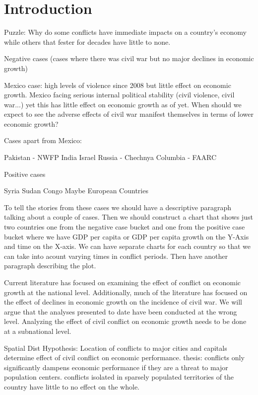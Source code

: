 \section{Introduction}
\label{intro}

Puzzle: Why do some conflicts have immediate impacts on a country's economy while others that fester for decades have little to none. 	

	Negative cases (cases where there was civil war but no major declines in economic growth)

		Mexico case: high levels of violence since 2008 but little effect on economic growth. Mexico facing serious internal political stability (civil violence, civil war...) yet this has little effect on economic growth as of yet. When should we expect to see the adverse effects of civil war manifest themselves in terms of lower economic growth?

	Cases apart from Mexico:

			Pakistan - NWFP
			India
			Israel
			Russia - Chechnya
			Columbia - FAARC

	Positive cases 

			Syria
			Sudan
			Congo
			Maybe European Countries

	To tell the stories from these cases we should have a descriptive paragraph talking about a couple of cases. Then we should construct a chart that shows just two countries one from the negative case bucket and one from the positive case bucket where we have GDP per capita or GDP per capita growth on the Y-Axis and time on the X-axis. We can have separate charts for each country so that we can take into acount varying times in conflict periods. Then have another paragraph describing the plot.

Current literature has focused on examining the effect of conflict on economic growth at the national level. Additionally, much of the literature has focused on the effect of declines in economic growth on the incidence of civil war. We will argue that the analyses presented to date have been conducted at the wrong level. Analyzing the effect of civil conflict on economic growth needs to be done at a subnational level. 

Spatial Dist Hypothesis: Location of conflicts to major cities and capitals determine effect of civil conflict on economic performance. thesis: conflicts only significantly dampens economic performance if they are a threat to major population centers. conflicts isolated in sparsely populated territories of the country have little to no effect on the whole. 